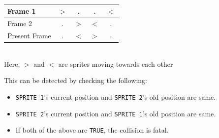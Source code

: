   \begin{table}[H]
    \centering
  \begin{tabular}{|l|cccc|}

    \hline
    Frame 1 &	$>$ &	.   &	.   &	$<$ \\ \hline
    Frame 2 &	.   &	$>$ &	$<$ & .	    \\ \hline
    Present Frame &	.   &	$<$ &	$>$ & .	    \\ \hline

  \end{tabular}
  \\[5pt]
  Here, $>$ and $<$ are sprites moving towards each other
  \end{table}

  This can be detected by checking the following:

  \begin{itemize}
    \item \texttt{SPRITE 1}'s current position and \texttt{SPRITE 2}'s old position are same.
    \item \texttt{SPRITE 2}'s current position and \texttt{SPRITE 1}'s old position are same.
    \item If both of the above are \texttt{TRUE}, the collision is fatal.
  \end{itemize}
